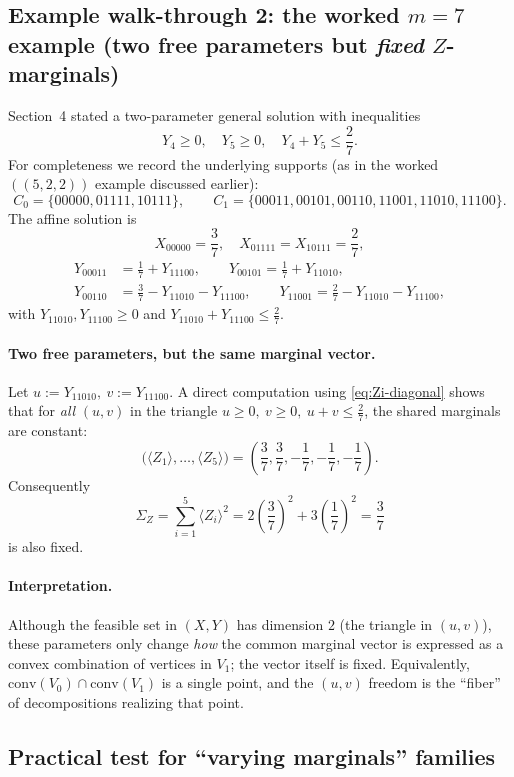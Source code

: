 \documentclass[11pt]{article}
\begin{document}
\subsection{Example walk-through 2: the worked $m=7$ example (two free parameters but \emph{fixed} $Z$-marginals)}
\label{subsec:walkthrough-worked}

Section~4 stated a two-parameter general solution with inequalities
\[
Y_4\ge 0,\quad Y_5\ge 0,\quad Y_4+Y_5\le \frac{2}{7}.
\]
For completeness we record the underlying supports (as in the worked $((5,2,2))$ example discussed earlier):
\[
C_0=\{00000,01111,10111\},
\qquad
C_1=\{00011,00101,00110,11001,11010,11100\}.
\]
The affine solution is
\[
X_{00000}=\frac{3}{7},\quad X_{01111}=X_{10111}=\frac{2}{7},
\]
\[
\begin{aligned}
Y_{00011}&=\frac{1}{7}+Y_{11100},\qquad
Y_{00101}=\frac{1}{7}+Y_{11010},\\
Y_{00110}&=\frac{3}{7}-Y_{11010}-Y_{11100},\qquad
Y_{11001}=\frac{2}{7}-Y_{11010}-Y_{11100},
\end{aligned}
\]
with $Y_{11010},Y_{11100}\ge 0$ and $Y_{11010}+Y_{11100}\le\tfrac{2}{7}$.

\paragraph{Two free parameters, but the same marginal vector.}
Let
\(
 u:=Y_{11010},\ v:=Y_{11100}
\).
A direct computation using \eqref{eq:Zi-diagonal} shows that for \emph{all} $(u,v)$ in the triangle
\(
 u\ge 0,\ v\ge 0,\ u+v\le \tfrac{2}{7}
\), the shared marginals are constant:
\[
\bigl(\langle Z_1\rangle,\dots,\langle Z_5\rangle\bigr)=\left(\frac{3}{7},\frac{3}{7},-\frac{1}{7},-\frac{1}{7},-\frac{1}{7}\right).
\]
Consequently
\[
\Sigma_Z=\sum_{i=1}^5\langle Z_i\rangle^2
=2\left(\frac{3}{7}\right)^2+3\left(\frac{1}{7}\right)^2
=\frac{3}{7}
\]
is also fixed.

\paragraph{Interpretation.}
Although the feasible set in $(X,Y)$ has dimension $2$ (the triangle in $(u,v)$), these parameters only change \emph{how} the common marginal vector is expressed as a convex combination of vertices in $V_1$; the vector itself is fixed. Equivalently, $\mathrm{conv}(V_0)\cap\mathrm{conv}(V_1)$ is a single point, and the $(u,v)$ freedom is the ``fiber'' of decompositions realizing that point.

\subsection{Practical test for ``varying marginals'' families}
\end{document}
